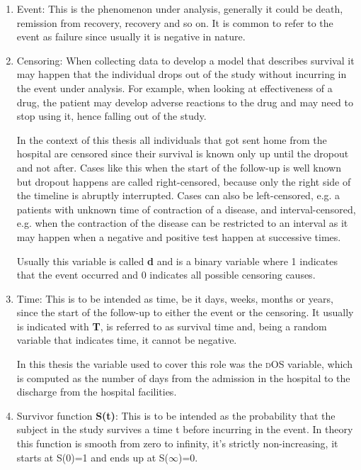 \begin{enumerate}
\item Event: This is the phenomenon under analysis, generally it could be death, remission from recovery, recovery and so on.
It is common to refer to the event as failure since usually it is negative in nature.
\item Censoring: When collecting data to develop a model that describes survival it may happen that the individual drops out of the study without incurring in the event under analysis.
For example, when looking at effectiveness of a drug, the patient may develop adverse reactions to the drug and may need to stop using it, hence falling out of the study.

In the context of this thesis all individuals that got sent home from the hospital are censored since their survival is known only up until the dropout and not after.
Cases like this when the start of the follow-up is well known but dropout happens are called right-censored, because only the right side of the timeline is abruptly interrupted.
Cases can also be left-censored, e.g. a patients with unknown time of contraction of a disease, and interval-censored, e.g. when the contraction of the disease can be restricted to an interval as it may happen when a negative and positive test happen at successive times.

Usually this variable is called \textbf{d} and is a binary variable where 1 indicates that the event occurred and 0 indicates all possible censoring causes.

\item Time: This is to be intended as time, be it days, weeks, months or years, since the start of the follow-up to either the event or the censoring.
It usually is indicated with \textbf{T}, is referred to as survival time and, being a random variable that indicates time, it cannot be negative.

In this thesis the variable used to cover this role was the {\scshape dOS} variable, which is computed as the number of days from the admission in the hospital to the discharge from the hospital facilities.

\item Survivor function \textbf{S(t)}: This is to be intended as the probability that the subject in the study survives a time t before incurring in the event.
In theory this function is smooth from zero to infinity, it's strictly non-increasing, it starts at S(0)=1 and ends up at S($\infty$)=0.


\end{enumerate}
